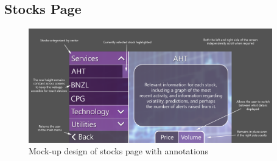 \documentclass[11pt, oneside, a4paper]{article}
\begin{document}
\subsection{Stocks Page}

\begin{figure}[h]
	\centering
		\includegraphics[width=400px]{StocksUIDesign.png}
	\caption{Mock-up design of stocks page with annotations}
	\label{StocksUI}
\end{figure}
\end{document}
